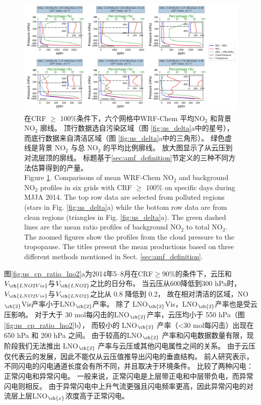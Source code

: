 \begin{figure}
\centering
\includegraphics[width=0.9\columnwidth]{./figures/us_bkgd_comp.png}%
\caption{在CRF $\geq$ 100\%条件下，六个网格中WRF-Chem 平均NO$_\textrm{2}$ 和背景 NO$_\textrm{2}$ 廓线。
顶行数据选自污染区域（图 \ref{fig:us_delta}a中的星号），而底行数据来自清洁区域（图 \ref{fig:us_delta}a中的三角形）。
绿色虚线是背景 NO$_\textrm{2}$ 与总 NO$_\textrm{2}$ 的平均比例廓线。
放大图显示了从云压到对流层顶的廓线。
标题基于\ref{sec:amf_definition}节定义的三种不同方法估算得到的产量。\\
Figure \ref{fig:us_bkgd_comp}. Comparisons of mean WRF-Chem NO$_\textrm{2}$ and background NO$_\textrm{2}$ profiles in six grids with CRF $\geq$ 100\% on specific days during MJJA 2014.
The top row data are selected from polluted regions (stars in Fig. \ref{fig:us_delta}a) while the bottom row data are from clean regions (triangles in Fig. \ref{fig:us_delta}a).
The green dashed lines are the mean ratio profiles of background NO$_\textrm{2}$ to total NO$_\textrm{2}$.
The zoomed figures show the profiles from the cloud pressure to the tropopause.
The titles present the mean productions based on three different methods mentioned in Sect. \ref{sec:amf_definition}.}
\label{fig:us_bkgd_comp}
\end{figure}

图\ref{fig:us_cp_ratio_lno2}a为2014年5--8月在CRF$\geq$90\%的条件下，云压和$V_{\ch{LNO2Vis}}$与$V_{\ch{LNO2}}$之比的日分布。
当云压从600降低到300 hPa时，$V_{\ch{LNO2Vis}}$与$V_{\ch{LNO2}}$之比从 0.8 降低到 0.2，
故在相对清洁的区域，NO$_{\ch{2}}$Vis产率小于LNO$_{\ch{2}}$产率。
除了 LNO$_{\ch{2}}$Vis，LNO$_{\ch{2}}$产率也是受云压影响。
对于大于 30 mol每闪击的LNO$_{\ch{2}}$产率，云压均小于 550 hPa（图\ref{fig:us_cp_ratio_lno2}b），
而较小的 LNO$_{\ch{2}}$ 产率（<30 mol每闪击）出现在 650 hPa 和 200 hPa 之间。
由于较高的LNO$_{\ch{2}}$ 产率和闪电数据数量有限，现阶段我们无法推出 LNO$_{\ch{2}}$ 产率与云压或其他闪电属性之间的关系。
由于云压仅代表云的发展，因此不能仅从云压值推导出闪电的垂直结构。
前人研究表示，不同闪电的闪电通道长度会有所不同，并且取决于环境条件\citep{Carey.2016,Mecikalski.2017,Fuchs.2018}。
\citet{Davis.2019}比较了两种闪电：正常闪电和异常闪电。
一般来说，正常闪电是上层带正电和中层带负电，而异常闪电则相反\citep{Williams.1989}。
由于异常闪电中上升气流更强且闪电频率更高，因此异常闪电的对流层上层LNO$_{\ch{x}}$浓度高于正常闪电。



